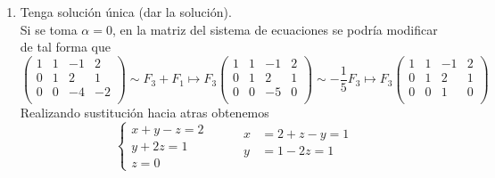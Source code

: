\documentclass{article}
\begin{document}
\begin{enumerate}
\begin{enumerate}[label=\listAlph]
            \item Tenga solución única (dar la solución). \\
                Si se toma \(\alpha = 0\), en la matriz del sistema de ecuaciones se podría modificar de tal forma que
                \[
                    \left(
                    \begin{array}{ccc|c}
                        1 & 1 & -1 & 2 \\
                        0 & 1 & 2 & 1 \\
                        0 & 0 & -4 & -2 \\
                    \end{array}
                    \right)
                    \sim
                    F_3 + F_1 \mapsto F_3
                    \left(
                    \begin{array}{ccc|c}
                        1 & 1 & -1 & 2 \\
                        0 & 1 & 2 & 1 \\
                        0 & 0 & -5 & 0 \\
                    \end{array}
                    \right)
                    \sim
                    -\frac{1}{5}F_3 \mapsto F_3
                    \left(
                    \begin{array}{ccc|c}
                        1 & 1 & -1 & 2 \\
                        0 & 1 & 2 & 1 \\
                        0 & 0 & 1 & 0 \\
                    \end{array}
                    \right)
                \]
                Realizando sustitución hacia atras obtenemos
                \[
                    \left\{
                        \begin{aligned}
                            x + y - z = 2 \\
                            y + 2z = 1 \\
                            z = 0
                        \end{aligned}
                    \right.
                    \hspace{1cm}
                    \begin{aligned}
                        x &= 2 + z - y = 1 \\
                        y &= 1 -2z = 1 \\

\end{aligned}\]
\end{enumerate}
\end{enumerate}
\end{document}
